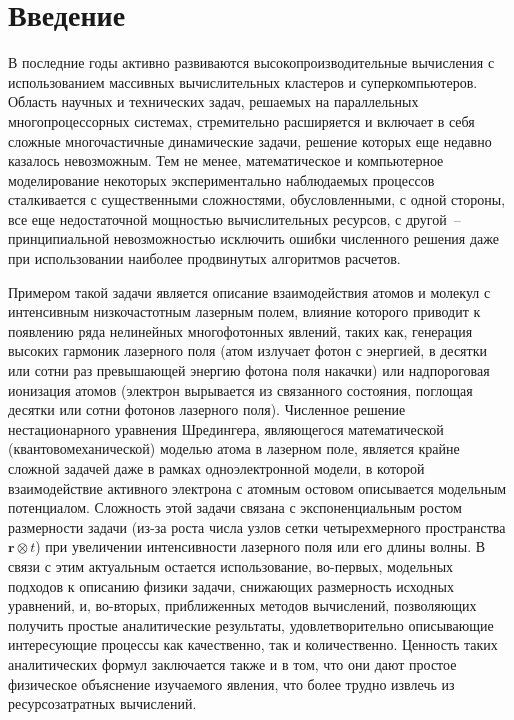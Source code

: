\documentclass[14pt, a4paper]{article}
\numberwithin{figure}{section}
\numberwithin{equation}{section}
\newcommand{\vr}{\mathbf{r}}
\begin{document}
\tableofcontents

\newpage

\section*{\centering Введение}

В последние годы активно развиваются высокопроизводительные вычисления с использованием массивных вычислительных кластеров и суперкомпьютеров. Область научных и технических задач, решаемых на параллельных многопроцессорных системах, стремительно расширяется и включает в себя сложные многочастичные динамические задачи, решение которых еще недавно казалось невозможным. Тем не менее, математическое и компьютерное моделирование некоторых экспериментально наблюдаемых процессов сталкивается с существенными сложностями, обусловленными, с одной стороны, все еще недостаточной мощностью вычислительных ресурсов, с другой~-- принципиальной невозможностью исключить ошибки численного решения даже при использовании наиболее продвинутых алгоритмов расчетов.  

Примером такой задачи является описание взаимодействия атомов и молекул с интенсивным низкочастотным лазерным полем, влияние которого приводит к появлению ряда нелинейных многофотонных явлений, таких как, генерация высоких гармоник лазерного поля (атом излучает фотон с энергией, в десятки или сотни раз превышающей энергию фотона поля накачки) или надпороговая ионизация атомов (электрон вырывается из связанного состояния, поглощая десятки или сотни фотонов лазерного поля). Численное решение нестационарного уравнения Шредингера, являющегося математической (квантовомеханической) моделью атома в лазерном поле, является крайне сложной задачей даже в рамках одноэлектронной модели, в которой взаимодействие активного электрона с атомным остовом описывается модельным потенциалом. Сложность этой задачи связана с экспоненциальным ростом размерности задачи (из-за роста числа узлов сетки четырехмерного пространства $\vr\otimes t$) при увеличении интенсивности лазерного поля или его длины волны. В связи с этим актуальным остается использование, во-первых, модельных подходов к описанию физики задачи, снижающих размерность исходных уравнений, и, во-вторых, приближенных методов вычислений, позволяющих получить простые аналитические результаты, удовлетворительно описывающие интересующие процессы как качественно, так и количественно. Ценность таких аналитических формул заключается также и в том, что они дают простое физическое объяснение изучаемого явления, что более трудно извлечь из ресурсозатратных вычислений.
\end{document}
